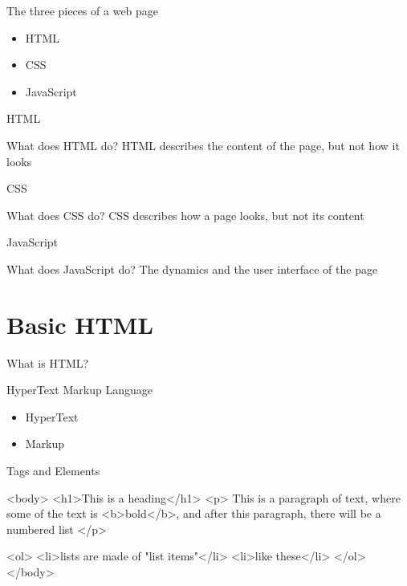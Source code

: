 \documentclass{beamer}
\begin{document}
\begin{frame}{The three pieces of a web page}
\begin{itemize}
  \item HTML \pause
  \item CSS \pause
  \item JavaScript
\end{itemize}
\end{frame}

\begin{frame}{HTML}
  \begin{block}{What does HTML do?}
    HTML describes the content of the page, \pause \textcolor{RedOrange}{but not how it looks}
  \end{block}
\end{frame}

\begin{frame}{CSS}
  \begin{block}{What does CSS do?}
    CSS describes how a page looks, \pause \textcolor{RedOrange}{but not its content}
  \end{block}
\end{frame}

\begin{frame}{JavaScript}
  \begin{block}{What does JavaScript do?}
    The dynamics and the user interface of the page
  \end{block}
\end{frame}
\section{Basic HTML}

\begin{frame}{What \alert{is} HTML?}
  \begin{block}{HyperText Markup Language}
      \begin{itemize}
        \item HyperText \pause
        \item Markup
      \end{itemize}
  \end{block}
\end{frame}

\begin{frame}[fragile]{Tags and Elements}
  \begin{block}{}
    \begin{semiverbatim}
 <body>
  <h1>This is a heading</h1>
  <p>
      This is a paragraph of text, 
      where some of the text is <b>bold</b>, and
      after this paragraph, there will be a numbered list
  </p>

  <ol>
    <li>lists are made of "list items"</li>
    <li>like these</li>
  </ol>
 </body>
    \end{semiverbatim}
  \end{block}
\end{frame}
\end{document}

